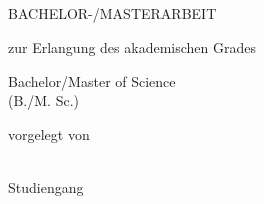 
\renewcommand{\today}{\ifnum\number\day<10 0\fi \number\day.\space%
\ifcase \month \or Januar \or Februar \or März \or April \or Mai %
\or Juni \or Juli \or August \or September \or Oktober \or November \or Dezember \fi %
\number \year}

\begin{titlepage}
	\begin{addmargin}[-1cm]{-3cm}
    \begin{center}
        \large
		
		\myUni \\ \vspace{0.6em} \myFaculty \\ \vspace{0.6em} \myDepartment{} \\

        \hfill

        \vfill

        \begingroup
            \color{Maroon}\LARGE{\spacedallcaps{\myTitle}} \\ \bigskip
        \endgroup


        \vfill \bigskip

        {\Huge BACHELOR-/MASTERARBEIT} \vfill\medskip

        zur Erlangung des akademischen Grades \\\vfill

        {\LARGE Bachelor/Master of Science}\\
        (B./M. Sc.)\\\vfill


		vorgelegt von\\\vfill

        \textbf{\myName}\\
		Studiengang \mySubject{}\vfill%



\end{center}
\end{addmargin}
\end{titlepage}
